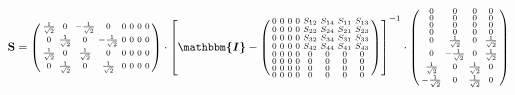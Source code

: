 \documentclass[10pt]{article} \usepackage{amsmath} \usepackage{bbold}
\begin{document}
\[ \mathbf{S} = \left(\begin{smallmatrix} \frac{1}{\sqrt{2}} & 0 &
-\frac{1}{\sqrt{2}} & 0 & 0 & 0 & 0 & 0 \\ 0 & \frac{1}{\sqrt{2}} & 0
& -\frac{1}{\sqrt{2}} & 0 & 0 & 0 & 0 \\ \frac{1}{\sqrt{2}} & 0 &
\frac{1}{\sqrt{2}} & 0 & 0 & 0 & 0 & 0 \\ 0 & \frac{1}{\sqrt{2}} & 0 &
\frac{1}{\sqrt{2}} & 0 & 0 & 0 & 0 \end{smallmatrix}\right) \cdot
\left[ \boldsymbol{\mathbbm{I}}  - \left(\begin{smallmatrix} 0 & 0 & 0
& 0 & S_{12} & S_{14} & S_{11} & S_{13} \\ 0 & 0 & 0 & 0 & S_{22} &
S_{24} & S_{21} & S_{23} \\ 0 & 0 & 0 & 0 & S_{32} & S_{34} & S_{31} &
S_{33} \\ 0 & 0 & 0 & 0 & S_{42} & S_{44} & S_{41} & S_{43} \\ 0 & 0 &
0 & 0 & 0 & 0 & 0 & 0 \\ 0 & 0 & 0 & 0 & 0 & 0 & 0 & 0 \\ 0 & 0 & 0 &
0 & 0 & 0 & 0 & 0 \\ 0 & 0 & 0 & 0 & 0 & 0 & 0 & 0
\end{smallmatrix}\right) \right]^{-1} \cdot\left(\begin{smallmatrix} 0
& 0 & 0 & 0 \\ 0 & 0 & 0 & 0 \\ 0 & 0 & 0 & 0 \\ 0 & 0 & 0 & 0 \\ 0 &
\frac{1}{\sqrt{2}} & 0 & \frac{1}{\sqrt{2}} \\ 0 & -\frac{1}{\sqrt{2}}
& 0 & \frac{1}{\sqrt{2}} \\ \frac{1}{\sqrt{2}} & 0 &
\frac{1}{\sqrt{2}} & 0 \\ -\frac{1}{\sqrt{2}} & 0 & \frac{1}{\sqrt{2}}
& 0 \end{smallmatrix}\right) \]
\end{document}

